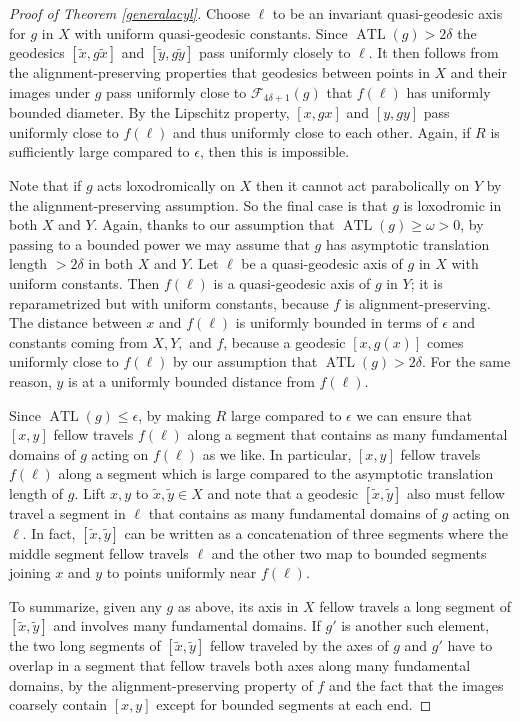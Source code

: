 \documentclass[11pt]{article}
\theoremstyle{remark}
\newcommand{\ATL}{\operatorname{ATL}}
\begin{document}
\begin{proof}[Proof of Theorem \ref{generalacyl}]
  Choose $\ell$ to be an invariant quasi-geodesic axis for $g$ in $X$
  with uniform quasi-geodesic constants. Since $\ATL(g)>2\delta$ the geodesics
  $[\widetilde x,g\widetilde x]$ and $[\widetilde y,g\widetilde y]$
  pass uniformly closely to
  $\ell$.
  It then follows from the alignment-preserving
  properties that geodesics between points in $X$ and their images
  under $g$ pass uniformly close to $\mathcal F_{4\delta+1}(g)$ that
  $f(\ell)$ has uniformly bounded diameter.
  By the Lipschitz property, $[x,gx]$ and $[y,gy]$ pass
  uniformly close to $f(\ell)$ and thus uniformly close to each other.
  Again, if $R$ is sufficiently
  large compared to $\epsilon$, then this is impossible.

  Note that if $g$ acts loxodromically on $X$ then it cannot act parabolically
  on $Y$ by the alignment-preserving assumption.
  So the final case is that $g$ is loxodromic in both $X$ and $Y$. Again,
  thanks to our assumption that $\ATL(g)\geq\omega>0$, by passing to
  a bounded power we may assume that $g$ has asymptotic translation
  length $>2\delta$ in both $X$ and $Y$. Let $\ell$ be a
  quasi-geodesic axis of $g$ in $X$ with uniform constants. Then
  $f(\ell)$ is a quasi-geodesic axis of $g$ in $Y$; it is
  reparametrized but with uniform constants, because $f$ is alignment-preserving.
  The distance between $x$ and $f(\ell)$ is uniformly
  bounded in terms of $\epsilon$ and constants coming from $X,Y,$ and
  $f$, because a geodesic $[x,g(x)]$ comes uniformly close to
  $f(\ell)$ by our assumption that $\ATL(g)>2\delta$. For the same
  reason, $y$ is at a uniformly bounded distance from $f(\ell)$.

  Since $\ATL(g)\leq\epsilon$,
  by making $R$ large compared to $\epsilon$
  we can ensure that $[x,y]$ fellow travels
  $f(\ell)$ along a segment that contains as many fundamental domains
  of $g$ acting on $f(\ell)$ as we like. In particular, $[x,y]$ fellow
  travels $f(\ell)$ along a segment which is large compared to the
  asymptotic translation length of $g$.
  Lift $x,y$ to $\widetilde
  x,\widetilde y\in X$ and note that a geodesic $[\widetilde
    x,\widetilde y]$ also must fellow travel a segment in $\ell$ that
  contains as many fundamental domains of $g$ acting on $\ell$. In
  fact, $[\widetilde
    x,\widetilde y]$ can be written as a concatenation of three
  segments where the middle segment fellow travels $\ell$ and the
  other two map to bounded segments joining $x$ and $y$ to points uniformly near $f(\ell)$.

  To
  summarize, given any $g$ as above, its axis in $X$ fellow
  travels a long segment of $[\widetilde x,\widetilde y]$ and
  involves many fundamental domains. If $g'$ is another such element,
  the two long segments of $[\widetilde x,\widetilde y]$ fellow
  traveled by the axes of $g$ and $g'$ have to overlap in a
  segment that fellow travels both axes along many fundamental domains,
  by the alignment-preserving property of $f$ and the fact that the
  images coarsely contain $[x,y]$ except for bounded segments at each
  end.


\end{proof}
\end{document}
